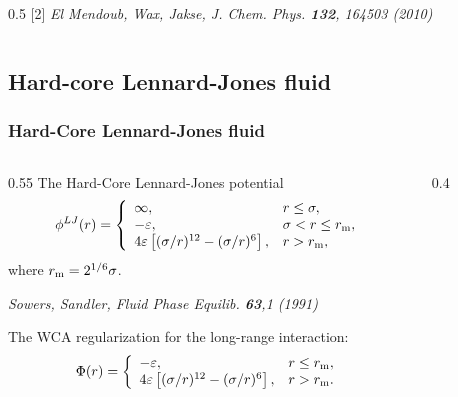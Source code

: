 \documentclass[8pt]{beamer}
\begin{document}
\begin{frame}
\begin{columns}
\begin{column}{0.5\textwidth}
				[2] \textit{El Mendoub, Wax, Jakse, J. Chem. Phys. \textbf{132}, 164503 (2010)}
			\end{column}
						
		\end{columns}
						
	\end{frame}
	
	\subsection{Hard-core Lennard-Jones fluid}
	
	\begin{frame}
		\frametitle{Hard-Core Lennard-Jones fluid}
		
		\begin{columns}
			\begin{column}{0.55\textwidth}
				The Hard-Core Lennard-Jones potential
				\begin{equation*}
					\phi^{LJ}(r) = \left\{
					\begin{array}{llll}
						\infty, & r\leq \sigma,
						\\
						-\varepsilon, & \sigma < r \leq r_{\rm m}, 
						\\
						4\varepsilon \left[(\sigma/r)^{12} - (\sigma/r)^6\right], & r > r_{\rm m},
					\end{array}
					\right.
				\end{equation*}
				where $r_{\rm m}=2^{1/6}\sigma$.
				
				\vspace{5mm}
				\textit{Sowers, Sandler, Fluid Phase Equilib. \textbf{63},1 (1991)}
				\hfill
				\\
				\hfill
				
				The WCA regularization for the long-range interaction:
				\begin{equation*}
					\Phi(r) = \left\{
					\begin{array}{ll}
						-\varepsilon, & r \leq r_{\rm m},
						\\
						4\varepsilon \left[(\sigma/r)^{12} - (\sigma/r)^6\right], & r > r_{\rm m}.
					\end{array}	
					\right.
				\end{equation*}
			\end{column}
			
			\begin{column}{0.4\textwidth}
				

\end{column}
\end{columns}
\end{frame}
\end{document}
